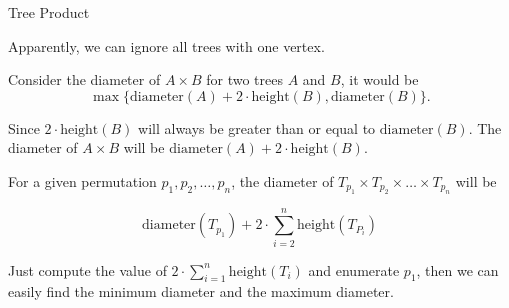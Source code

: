 \begin{tutorial}{Tree Product}

Apparently, we can ignore all trees with one vertex.

Consider the diameter of $A \times B$ for two trees $A$ and $B$, it would be
$$
\max\{\mathrm{diameter}(A) + 2 \cdot \mathrm{height}(B), \mathrm{diameter}(B)\}.
$$

Since $2 \cdot \mathrm{height}(B)$ will always be greater than or equal to $\mathrm{diameter}(B)$. The diameter of $A \times B$ will be $\mathrm{diameter}(A) + 2 \cdot \mathrm{height}(B)$.

For a given permutation $p_1,p_2,\ldots,p_n$, the diameter of $T_{p_1} \times T_{p_2} \times \ldots \times T_{p_n}$ will be 

$$
\mathrm{diameter}(T_{p_1}) + 2 \cdot \sum_{i=2}^{n} \mathrm{height}(T_{P_i})
$$

Just compute the value of $2 \cdot \sum_{i=1}^{n} \mathrm{height}(T_{i})$ and enumerate $p_1$, then we can easily find the minimum diameter and the maximum diameter.

\end{tutorial}

